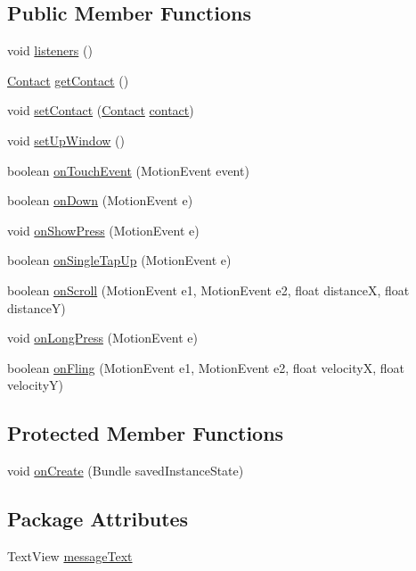 \subsection*{Public Member Functions}
\begin{DoxyCompactItemize}
\item 
void \hyperlink{a00013_a92b8e0730130e1184a8cdbd89590779d}{listeners} ()
\item 
\hyperlink{a00005}{Contact} \hyperlink{a00013_adb647c7ae09f1d5755db63d701968925}{get\+Contact} ()
\item 
void \hyperlink{a00013_abef3c7b6635dc06ac6b8e4b37c51b37f}{set\+Contact} (\hyperlink{a00005}{Contact} \hyperlink{a00013_a3459849ab29ad684658dbcd0cf8c5d5a}{contact})
\item 
void \hyperlink{a00013_ae101bc9d661896c7dda12efd1e7b91d2}{set\+Up\+Window} ()
\item 
boolean \hyperlink{a00013_ab52b3ce187f918e0bc8f5a34c1e347a3}{on\+Touch\+Event} (Motion\+Event event)
\item 
boolean \hyperlink{a00013_afe7febda1f2210be8658c06fce770e1c}{on\+Down} (Motion\+Event e)
\item 
void \hyperlink{a00013_a929cec72582aad79985fd2927344b9c7}{on\+Show\+Press} (Motion\+Event e)
\item 
boolean \hyperlink{a00013_a05333c5dbd12d347d100d8cb029e4530}{on\+Single\+Tap\+Up} (Motion\+Event e)
\item 
boolean \hyperlink{a00013_af912304fa5a847e1231b71015c2ed06a}{on\+Scroll} (Motion\+Event e1, Motion\+Event e2, float distance\+X, float distance\+Y)
\item 
void \hyperlink{a00013_ac12f39cb7fd9003b2aa5ddf76f2e93fe}{on\+Long\+Press} (Motion\+Event e)
\item 
boolean \hyperlink{a00013_ae44fb084c2495a486a664f60ae319b8c}{on\+Fling} (Motion\+Event e1, Motion\+Event e2, float velocity\+X, float velocity\+Y)
\end{DoxyCompactItemize}
\subsection*{Protected Member Functions}
\begin{DoxyCompactItemize}
\item 
void \hyperlink{a00013_a85e87cb5ced88dff7c8173ecc4f636d1}{on\+Create} (Bundle saved\+Instance\+State)
\end{DoxyCompactItemize}
\subsection*{Package Attributes}
\begin{DoxyCompactItemize}
\item 
Text\+View \hyperlink{a00013_a4d3c87657c6cce664136ba8ae0a78c52}{message\+Text}
\end{DoxyCompactItemize}
